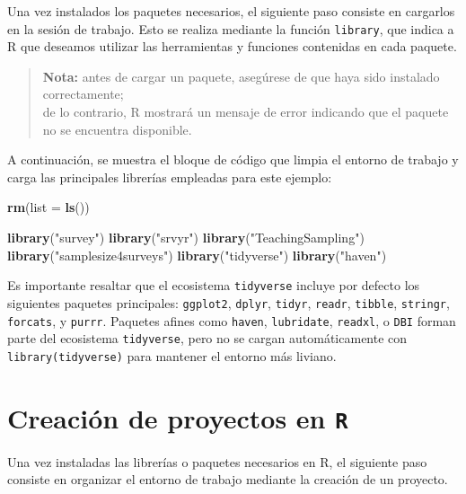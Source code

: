 \documentclass[
  spanish,
  12pt,
]{book}
\newenvironment{Shaded}{\begin{snugshade}}{\end{snugshade}}
\newcommand{\AttributeTok}[1]{\textcolor[rgb]{0.13,0.29,0.53}{#1}}
\newcommand{\FunctionTok}[1]{\textcolor[rgb]{0.13,0.29,0.53}{\textbf{#1}}}
\newcommand{\NormalTok}[1]{#1}
\newcommand{\StringTok}[1]{\textcolor[rgb]{0.31,0.60,0.02}{#1}}
\begin{document}
Una vez instalados los paquetes necesarios, el siguiente paso consiste en cargarlos en la sesión de trabajo. Esto se realiza mediante la función \texttt{library}, que indica a R que deseamos utilizar las herramientas y funciones contenidas en cada paquete.

\begin{quote}
\textbf{Nota:} antes de cargar un paquete, asegúrese de que haya sido instalado correctamente;\\
de lo contrario, R mostrará un mensaje de error indicando que el paquete no se encuentra disponible.
\end{quote}

A continuación, se muestra el bloque de código que limpia el entorno de trabajo y carga las principales librerías empleadas para este ejemplo:

\begin{Shaded}
\begin{Highlighting}[]
\FunctionTok{rm}\NormalTok{(}\AttributeTok{list =} \FunctionTok{ls}\NormalTok{())}

\FunctionTok{library}\NormalTok{(}\StringTok{"survey"}\NormalTok{)}
\FunctionTok{library}\NormalTok{(}\StringTok{"srvyr"}\NormalTok{)}
\FunctionTok{library}\NormalTok{(}\StringTok{"TeachingSampling"}\NormalTok{)}
\FunctionTok{library}\NormalTok{(}\StringTok{"samplesize4surveys"}\NormalTok{)}
\FunctionTok{library}\NormalTok{(}\StringTok{"tidyverse"}\NormalTok{)}
\FunctionTok{library}\NormalTok{(}\StringTok{"haven"}\NormalTok{)}
\end{Highlighting}
\end{Shaded}

Es importante resaltar que el ecosistema \texttt{tidyverse} incluye por defecto los siguientes paquetes principales: \texttt{ggplot2}, \texttt{dplyr}, \texttt{tidyr}, \texttt{readr}, \texttt{tibble}, \texttt{stringr}, \texttt{forcats}, y \texttt{purrr}. Paquetes afines como \texttt{haven}, \texttt{lubridate}, \texttt{readxl}, o \texttt{DBI} forman parte del ecosistema \texttt{tidyverse}, pero no se cargan automáticamente con \texttt{library(tidyverse)} para mantener el entorno más liviano.

\section{\texorpdfstring{Creación de proyectos en \texttt{R}}{Creación de proyectos en R}}\label{creaciuxf3n-de-proyectos-en-r}

Una vez instaladas las librerías o paquetes necesarios en R, el siguiente paso consiste en organizar el entorno de trabajo mediante la creación de un proyecto.
\end{document}
